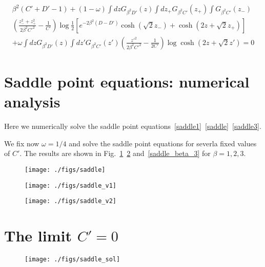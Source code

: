 \documentclass[onecolumn,superscriptaddress,pr]{revtex4}
\begin{document}
\begin{multline}
\label{saddle3}
\beta^2(C'+D'-1)+(1-\omega)\int dzG_{\beta^2D'}(z)\int dz_+G_{\beta^2C'}(z_+)\int G_{\beta^2C'}(z_-)
\\
\left(\frac{z_-^2+z^2_+}{2\beta^2C'^2}-\frac{1}{C'}\right)\log\frac{1}{2}\left[e^{-2\beta^2(D-D')}\cosh(\sqrt{2}z_-)+
\cosh(2z+\sqrt{2}z_+)\right]\\
+\omega\int dz G_{\beta^2D'}(z)\int dz'G_{\beta^2C'}(z')\left(\frac{z'^2}{2\beta^2C'^2}-\frac{1}{2C'}\right)
\log\cosh(2z+\sqrt{2}z')=0
\end{multline}

\section{Saddle point equations: numerical analysis}

Here we numerically solve the saddle point 
equations~\eqref{saddle1}~\eqref{saddle}~\eqref{saddle3}. 

We fix now $\omega=1/4$ and solve the saddle point equations 
for severla fixed values of $C'$. The results are shown in 
Fig.~\ref{saddle_beta_1}~\ref{saddle_beta_2} and~\ref{saddle_beta_3} 
for $\beta=1,2,3$. 

\begin{figure}[t]
\texttt{[image: ./figs/saddle]}
\caption{\label{saddle_beta_1}
}
\end{figure}

\begin{figure}[t]
\texttt{[image: ./figs/saddle\_v1]}
\caption{\label{saddle_beta_2}
}
\end{figure}

\begin{figure}[t]
\texttt{[image: ./figs/saddle\_v2]}
\caption{\label{saddle_sw}
}
\end{figure}

\section{The limit $C'=0$}

\begin{figure}[t]
\texttt{[image: ./figs/saddle\_sol]}
\caption{\label{saddle_sol}
}
\end{figure}
\end{document}
